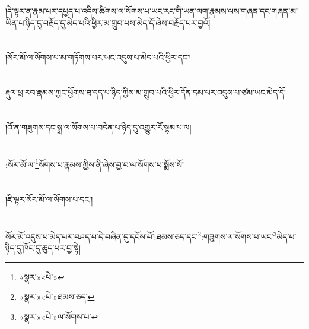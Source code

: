 །དེ་ལྟར་ན་རྣམ་པར་དཔྱད་པ་འདིས་ཚིགས་ལ་སོགས་པ་ཡང་རང་གི་ཡན་ལག་རྣམས་ལས་གཞན་དང་གཞན་མ་ཡིན་པ་ཉིད་དུ་བརྗོད་དུ་མེད་པའི་ཕྱིར་མ་གྲུབ་པས་མེད་དོ་ཞེས་བརྗོད་པར་བྱའོ།\chapter{ }།སོར་མོ་ལ་སོགས་པ་མ་གཏོགས་པར་ཡང་འདུས་པ་མེད་པའི་ཕྱིར་དང་།\chapter{ }རྡུལ་ཕྲ་རབ་རྣམས་ཀྱང་ཕྱོགས་ཐ་དད་པ་ཉིད་ཀྱིས་མ་གྲུབ་པའི་ཕྱིར་དོན་དམ་པར་འདུས་པ་ཙམ་ཡང་མེད་དོ།\chapter{ }།འོ་ན་གཟུགས་དང་སྒྲ་ལ་སོགས་པ་བདེན་པ་ཉིད་དུ་འགྱུར་རོ་སྙམ་པ་ལ།\chapter{ }:སོར་མོ་ལ་\footnote{«སྣར་»«པེ་»}སོགས་པ་རྣམས་ཀྱིས་ནི་ཞེས་བྱ་བ་ལ་སོགས་པ་སྨོས་སོ།\chapter{ }།ཇི་ལྟར་སོར་མོ་ལ་སོགས་པ་དང་།\chapter{ }སོར་མོ་འདུས་པ་མེད་པར་བཤད་པ་དེ་བཞིན་དུ་དངོས་པོ་:ཐམས་ཅད་དང་\footnote{«སྣར་»«པེ་»ཐམས་ཅད་}:གཟུགས་ལ་སོགས་པ་ཡང་\footnote{«སྣར་»«པེ་»ལ་སོགས་པ་}མེད་པ་ཉིད་དུ་ཁོང་དུ་ཆུད་པར་བྱ་སྟེ།\ch